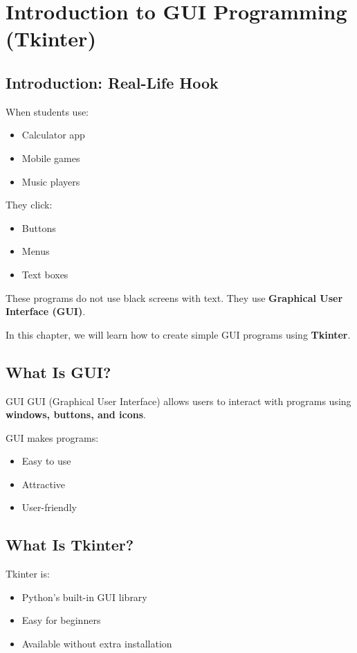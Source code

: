 \chapter{Introduction to GUI Programming (Tkinter)}

\section{Introduction: Real-Life Hook}

When students use:
\begin{itemize}
    \item Calculator app
    \item Mobile games
    \item Music players
\end{itemize}

They click:
\begin{itemize}
    \item Buttons
    \item Menus
    \item Text boxes
\end{itemize}

These programs do not use black screens with text.
They use \textbf{Graphical User Interface (GUI)}.

In this chapter, we will learn how to create simple GUI programs using \textbf{Tkinter}.

\section{What Is GUI?}

\begin{definition}{GUI}
GUI (Graphical User Interface) allows users to interact with programs using \textbf{windows, buttons, and icons}.
\end{definition}

GUI makes programs:
\begin{itemize}
    \item Easy to use
    \item Attractive
    \item User-friendly
\end{itemize}

\section{What Is Tkinter?}

Tkinter is:
\begin{itemize}
    \item Python’s built-in GUI library
    \item Easy for beginners
    \item Available without extra installation
\end{itemize}

